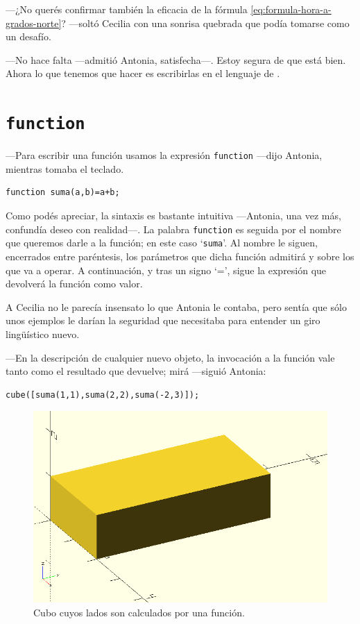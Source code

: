 ---¿No querés confirmar también la eficacia de la fórmula
\ref{eq:formula-hora-a-grados-norte}? ---soltó Cecilia con una
sonrisa quebrada que podía tomarse como un desafío.

---No hace falta ---admitió Antonia, sa\-tis\-fe\-cha---. Estoy segura
de que está bien. Ahora lo que tenemos que hacer es escribirlas en el
lenguaje de \openscad.

\section[function]{\lstinline!function!}

---Para escribir una función usamos la expresión \lstinline!function!
---di\-jo Antonia, mientras tomaba el teclado.

\begin{lstlisting}[numbers=none]
function suma(a,b)=a+b;
\end{lstlisting}

\guillemotright Como podés apreciar, la sintaxis es bastante intuitiva
---An\-to\-nia, una vez más, confundía deseo con realidad---. La palabra
\lstinline!function! es seguida por el nombre que queremos darle a la
función; en este caso `\lstinline!suma!'. Al nombre le siguen,
encerrados entre paréntesis, los parámetros que dicha función admitirá
y sobre los que va a operar. A continuación, y tras un signo `=',
sigue la expresión que devolverá la función como valor.

A Cecilia no le parecía insensato lo que Antonia le contaba, pero
sentía que sólo unos ejemplos le darían la seguridad que necesitaba
para entender un giro lingüístico nuevo.

---En la descripción de cualquier nuevo objeto, la invocación a la
función vale tanto como el resultado que devuelve; mirá ---siguió
Antonia:

    \begin{lstlisting}[numbers=none]
cube([suma(1,1),suma(2,2),suma(-2,3)]);
    \end{lstlisting}

    \begin{figure}[ht]
      \centering
      \includegraphics[width=.45\textwidth]{imagenes/cubo-funcion}      
      \caption[Cubo (función)]{Cubo cuyos lados son calculados por una
        función.}
      \label{fig:cubo-funcion}
    \end{figure}


